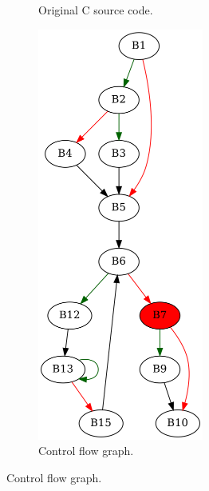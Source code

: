 \begin{figure}[htbp]
	\centering
	\begin{subfigure}[b]{0.30\textwidth}
		\centering
		
		\caption{Original C source code.}
	\end{subfigure}
	\begin{subfigure}[b]{0.50\textwidth}
		\centering
		\includegraphics[width=0.6\textwidth]{inc/appendices/examples/interval/example/sample/f_0004b.png}
		\caption{Control flow graph.}
	\end{subfigure}
\end{figure}

